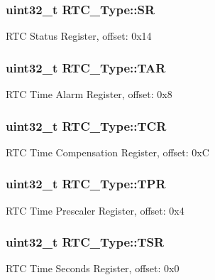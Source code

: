 \subsubsection[{\texorpdfstring{SR}{SR}}]{ uint32\+\_\+t R\+T\+C\+\_\+\+Type\+::\+SR}\hypertarget{structRTC__Type_ae12dc1e198cb7aa7602e59e36bbf43b6}{}\label{structRTC__Type_ae12dc1e198cb7aa7602e59e36bbf43b6}
R\+TC Status Register, offset\+: 0x14 
\subsubsection[{\texorpdfstring{T\+AR}{TAR}}]{ uint32\+\_\+t R\+T\+C\+\_\+\+Type\+::\+T\+AR}\hypertarget{structRTC__Type_ac67e5fa23e338883e5efd5b036164f26}{}\label{structRTC__Type_ac67e5fa23e338883e5efd5b036164f26}
R\+TC Time Alarm Register, offset\+: 0x8 
\subsubsection[{\texorpdfstring{T\+CR}{TCR}}]{ uint32\+\_\+t R\+T\+C\+\_\+\+Type\+::\+T\+CR}\hypertarget{structRTC__Type_a576676dbe6140e6ac08dfbf9a54aea17}{}\label{structRTC__Type_a576676dbe6140e6ac08dfbf9a54aea17}
R\+TC Time Compensation Register, offset\+: 0xC 
\subsubsection[{\texorpdfstring{T\+PR}{TPR}}]{ uint32\+\_\+t R\+T\+C\+\_\+\+Type\+::\+T\+PR}\hypertarget{structRTC__Type_ab718ffaf4897a4eec35a15790bae8806}{}\label{structRTC__Type_ab718ffaf4897a4eec35a15790bae8806}
R\+TC Time Prescaler Register, offset\+: 0x4 
\subsubsection[{\texorpdfstring{T\+SR}{TSR}}]{ uint32\+\_\+t R\+T\+C\+\_\+\+Type\+::\+T\+SR}\hypertarget{structRTC__Type_a5c8182569d4fb9aa8403e3f5933058a6}{}\label{structRTC__Type_a5c8182569d4fb9aa8403e3f5933058a6}
R\+TC Time Seconds Register, offset\+: 0x0 
